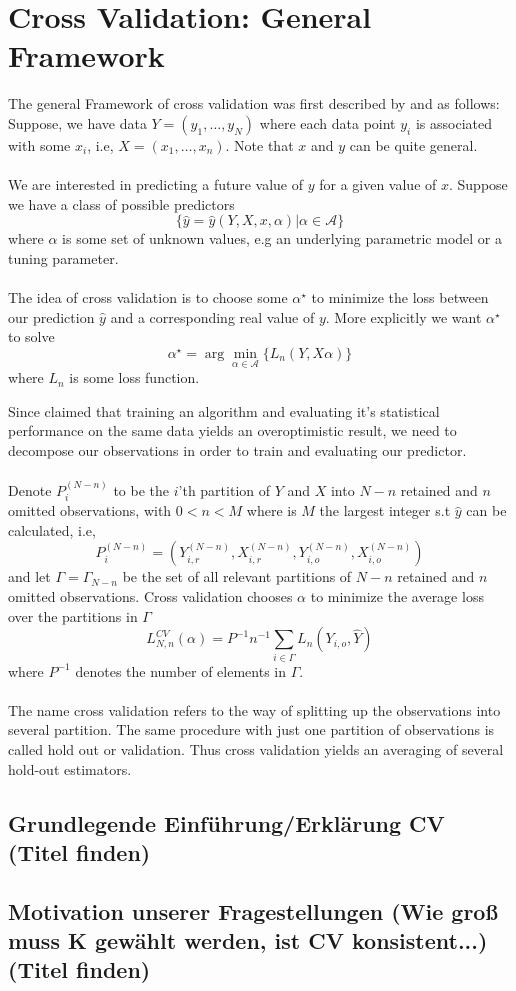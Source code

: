 \documentclass[Research_Module_ES.tex]{subfiles}
\begin{document}
\section{Cross Validation: General Framework}
The general Framework of cross validation was first described by \cite{stone1974cross} and  \cite{geisser1975predictive} as follows: \\

Suppose, we have data $Y=(y_1,\ldots,y_N)$ where each data point $y_i$ is associated with some $x_i$, i.e, $X=(x_1,\ldots,x_n)$. Note that $x$ and $y$ can be quite general.\\
\\
We are interested in predicting a future value of $y$ for a given value of $x$. Suppose we have a class of possible predictors 
\[
	\{\hat{y}=\hat{y}(Y,X,x,\alpha)|\alpha\in\mathscr{A}\}
\]
where $\alpha$ is some set of unknown values, e.g an underlying parametric model or a tuning parameter.\\
\\
The idea of cross validation is to choose some $\alpha^\star$ to minimize the loss between our prediction $\hat{y}$ and a corresponding real value of $y$. More explicitly we want $\alpha^\star$ to solve
\[
	\alpha^\star=\arg\min_{\alpha\in\mathscr{A}}\{L_n(Y,X\alpha)\}
\]
where $L_n$ is some loss function.
 
Since \cite{larson1931shrinkage} claimed that training an algorithm and evaluating it's statistical performance on the same data yields an overoptimistic result, we need to decompose our observations in order to train and evaluating our predictor. \\
\\
Denote $P^{(N-n)}_i$ to be the $i$'th partition of $Y$ and $X$ into $N-n$ retained and $n$ omitted observations, with $0<n<M$ where is $M$ the largest integer s.t $\hat{y}$ can be calculated, i.e,
\[
	P^{(N-n)}_i=(Y_{i,r}^{(N-n)},X_{i,r}^{(N-n)},Y_{i,o}^{(N-n)},X_{i,o}^{(N-n)})
\]
and let $\Gamma=\Gamma_{N-n}$ be the set of all relevant partitions of $N-n$ retained and $n$ omitted observations. Cross validation chooses $\alpha$ to minimize the average loss over the partitions in $\Gamma$ 
\[
	L_{N,n}^{CV}(\alpha)=P^{-1}n^{-1}\sum_{i\in\Gamma}L_n(Y_{i,o},\hat{Y})
\]
where $P^{-1}$ denotes the number of elements in $\Gamma$.\\
\\
The name cross validation refers to the way of splitting up the observations into several partition. The same procedure with just one partition of observations is called hold out or validation. Thus cross validation yields an averaging of several hold-out estimators.







\subsection{Grundlegende Einführung/Erklärung CV (Titel finden)}
\subsection{Motivation unserer Fragestellungen (Wie groß muss K gewählt werden, ist CV konsistent...)(Titel finden)}
\end{document}
